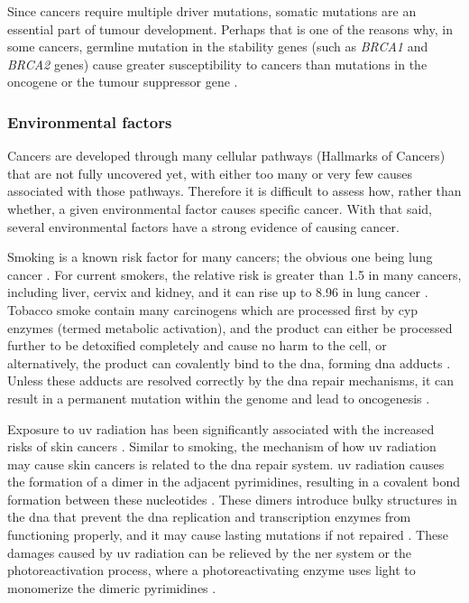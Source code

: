 Since cancers require multiple driver mutations, somatic mutations are an essential part of tumour development.
Perhaps that is one of the reasons why, in some cancers, germline mutation in the stability genes (such as \textit{BRCA1} and \textit{BRCA2} genes) cause greater susceptibility to cancers than mutations in the oncogene or the tumour suppressor gene \citep{Vogelstein2004a}.

\subsubsection{Environmental factors}
\label{ssub:environmental_factors}

Cancers are developed through many cellular pathways (Hallmarks of Cancers) that are not fully uncovered yet, with either too many or very few causes associated with those pathways.
Therefore it is difficult to assess how, rather than whether, a given environmental factor causes specific cancer.
With that said, several environmental factors have a strong evidence of causing cancer.

Smoking is a known risk factor for many cancers; the obvious one being lung cancer \citep{Gandini2008,Hecht1999}.
For current smokers, the relative risk is greater than 1.5 in many cancers, including liver, cervix and kidney, and it can rise up to 8.96 in lung cancer \citep{Gandini2008}.
Tobacco smoke contain many carcinogens which are processed first by \gls{cyp} enzymes (termed meta\-bolic activation), and the product can either be processed further to be detoxified completely and cause no harm to the cell, or alternatively, the product can covalently bind to the \acrshort{dna}, forming \acrshort{dna} adducts \citep{Hecht1999}.
Unless these adducts are resolved correctly by the \acrshort{dna} repair mechanisms, it can result in a permanent mutation within the genome and lead to oncogenesis \citep{Hecht1999}.

Exposure to \gls{uv} radiation has been significantly associated with the increased risks of skin cancers \citep{Armstrong2001,Gallagher2006}.
Similar to smoking, the mechanism of how \gls{uv} radiation may cause  skin cancers is related to the \acrshort{dna} repair system.
\gls{uv} radiation causes the formation of a dimer in the adjacent pyrimidines, resulting in a covalent bond formation between these nucleotides \citep{Friedberg2003,Hoeijmakers2001}.
These dimers introduce bulky structures in the \acrshort{dna} that prevent the \acrshort{dna} replication and transcription enzymes from functioning properly, and it may cause lasting mutations if not repaired \citep{Friedberg2003,Hoeijmakers2001}.
These damages caused by \gls{uv} radiation can be relieved by the \gls{ner} system or the photoreactivation process, where a photoreactivating enzyme uses light to monomerize the dimeric pyrimidines \citep{Friedberg2003}.

